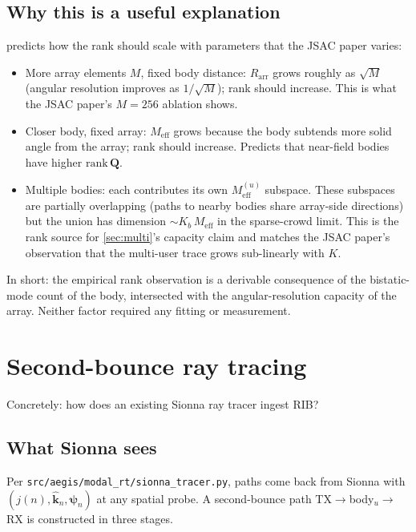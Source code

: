 \documentclass[11pt,a4paper]{article}
\theoremstyle{definition}
\newcommand{\khat}{\hat{\bm{k}}}
\begin{document}
\subsection{Why this is a useful explanation}

 predicts how the rank should scale with
parameters that the JSAC paper varies:
\begin{itemize}[leftmargin=1.6em,itemsep=2pt]
\item More array elements $M$, fixed body distance: $R_{\mathrm{arr}}$
grows roughly as $\sqrt{M}$ (angular resolution improves as
$1/\sqrt{M}$); rank should increase.  This is what the JSAC paper's
$M=256$ ablation shows.
\item Closer body, fixed array: $M_{\mathrm{eff}}$ grows because
the body subtends more solid angle from the array; rank should
increase.  Predicts that near-field bodies have higher
$\mathrm{rank}\,\mathbf{Q}$.
\item Multiple bodies: each contributes its own
$M_{\mathrm{eff}}^{(u)}$ subspace.  These subspaces are partially
overlapping (paths to nearby bodies share array-side directions)
but the union has dimension $\sim K_b\,M_{\mathrm{eff}}$ in the
sparse-crowd limit.  This is the rank source for
\cref{sec:multi}'s capacity claim and matches the JSAC paper's
observation that the multi-user trace grows sub-linearly with $K$.
\end{itemize}

In short: the empirical rank observation is a derivable consequence
of the bistatic-mode count of the body, intersected with the
angular-resolution capacity of the array.  Neither factor required
any fitting or measurement.

\section{Second-bounce ray tracing}\label{sec:secondbounce}

Concretely: how does an existing Sionna ray tracer ingest RIB?

\subsection{What Sionna sees}

Per \texttt{src/aegis/modal\_rt/sionna\_tracer.py}, paths come back
from Sionna with $(j(n),\khat_n,\bm\psi_n)$ at any spatial probe.
A second-bounce path TX$\to$body$_u\to$RX is constructed in three
stages.
\end{document}
